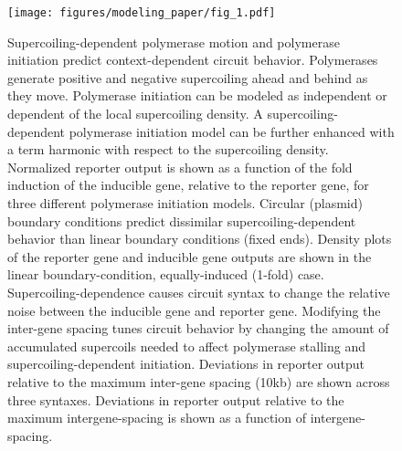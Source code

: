 \documentclass[11pt]{article}
\begin{document}
\begin{figure}[h]
    \centering
    {\texttt{[image: figures/modeling\_paper/fig\_1.pdf]}
    \label{fig:supercoiling_with_energy_cartoon}
    \label{fig:reporter_output_by_init_type}
    \label{fig:reporter_output_by_bc}
    \label{fig:output_distribution_by_orientation}
    \label{fig:intergene_spacing_cartoon}
    \label{fig:reporter_output_by_intergene_spacing}
    \label{fig:reporter_output_by_spacing_fold_induction}}
    \caption{Supercoiling-dependent polymerase motion and polymerase initiation predict context-dependent circuit behavior.
          Polymerases generate positive and negative supercoiling ahead and behind as they move. Polymerase initiation can be modeled as independent or dependent of the local supercoiling density. A supercoiling-dependent polymerase initiation model can be further enhanced with a term harmonic with respect to the supercoiling density.
         Normalized reporter output is shown as a function of the fold induction of the inducible gene, relative to the reporter gene, for three different polymerase initiation models.
         Circular (plasmid) boundary conditions predict dissimilar supercoiling-dependent behavior than linear boundary conditions (fixed ends).
         Density plots of the reporter gene and inducible gene outputs are shown in the linear boundary-condition, equally-induced (1-fold) case. Supercoiling-dependence causes circuit syntax to change the relative noise between the inducible gene and reporter gene.
         Modifying the inter-gene spacing tunes circuit behavior by changing the amount of accumulated supercoils needed to affect polymerase stalling and supercoiling-dependent initiation.
         Deviations in reporter output relative to the maximum inter-gene spacing (10kb) are shown across three syntaxes.
         Deviations in reporter output relative to the maximum intergene-spacing is shown as a function of intergene-spacing.
    } \label{fig:top:orientation_bc_behavior}
\end{figure}
\end{document}
